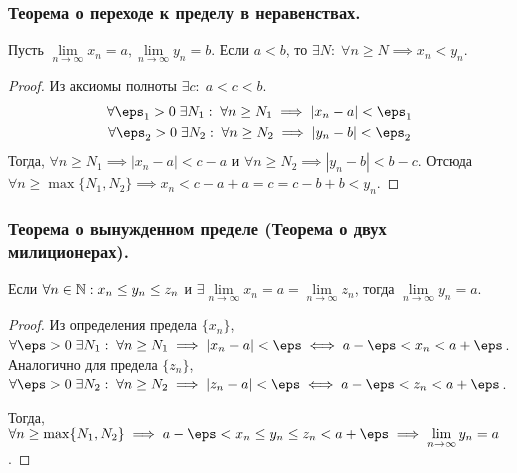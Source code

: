 \documentclass[12pt, a4paper]{article}
\begin{document}
	\subsubsection{Теорема о переходе к пределу в неравенствах.}
	\begin{theorem*}
		Пусть $\lim\limits_{n \to \infty} x_n = a, \lim\limits_{n \to \infty} y_n = b$. Если $a < b$, то
		$\exists N: \; \forall n \geq N \implies x_n < y_n$.
	\end{theorem*}
	\begin{proof}
		Из аксиомы полноты $\exists c: \; a < c < b$. 
		\[\begin{gathered}
			\forall \eps_1 > 0 \; \exists N_1: \; \forall n \geq N_1 \implies |x_n - a| < \eps_1 \\
			\forall \eps_2 > 0 \; \exists N_2: \; \forall n \geq N_2 \implies |y_n - b| < \eps_2 \\
		\end{gathered}\]
		Тогда, $\forall n \geq N_1 \implies |x_n - a| < c - a$ и $\forall n \geq N_2 \implies |y_n - b| < b - c$. Отсюда $\forall n \geq \max \{N_1, N_2\} \implies x_n < c - a + a = c = c - b + b < y_n$.
	\end{proof}

	\subsubsection{Теорема о вынужденном пределе (Теорема о двух милиционерах).}
	\begin{theorem*}
		Если $\forall n \in \mathbb{N}: x_n \leq y_n \leq z_n$ и $\exists \lim\limits_{n \to \infty} x_n = a = \lim\limits_{n \to \infty} z_n$, тогда $\lim\limits_{n \to \infty} y_n = a$.
	\end{theorem*}
	\begin{proof}
		Из определения предела $\{x_n\}$, $\forall \eps > 0 \; \exists N_1: \; \forall n \geq N_1 \implies |x_n - a| < \eps \iff a - \eps < x_n < a + \eps$. Аналогично для предела $\{z_n\}$, $\forall \eps > 0 \; \exists N_2: \; \forall n \geq N_2 \implies |z_n - a| < \eps \iff a - \eps < z_n < a + \eps$. 

		Тогда, 
		$\forall n \geq \max \{N_1, N_2\} \implies a - \eps < x_n \leq y_n \leq z_n < a + \eps \implies \lim\limits_{n \to \infty} y_n = a$.
	\end{proof}
\end{document}
